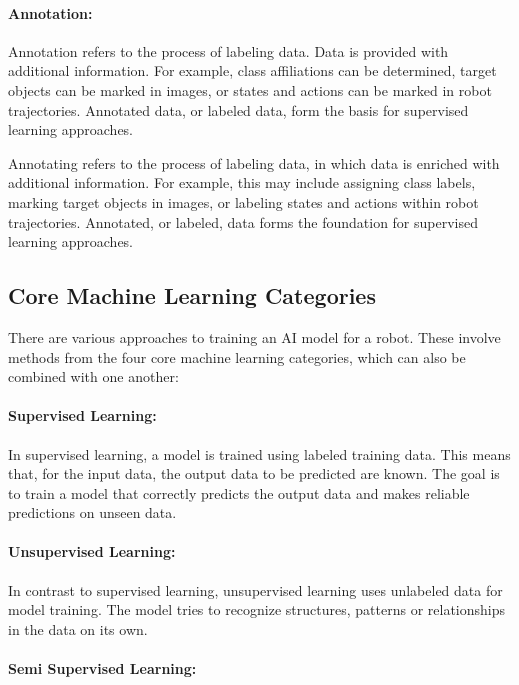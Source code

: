 \paragraph{Annotation:}

Annotation refers to the process of labeling data. Data is provided with additional information. For example, class affiliations can be determined, target objects can be marked in images, or states and actions can be marked in robot trajectories. Annotated data, or labeled data, form the basis for supervised learning approaches.

Annotating refers to the process of labeling data, in which data is enriched with additional information. For example, this may include assigning class labels, marking target objects in images, or labeling states and actions within robot trajectories. Annotated, or labeled, data forms the foundation for supervised learning approaches.


\subsection{Core Machine Learning Categories}
There are various approaches to training an AI model for a robot. These involve methods from the four core machine learning categories, which can also be combined with one another:

\paragraph{Supervised Learning: }

In supervised learning, a model is trained using labeled training data. This means that, for the input data, the output data to be predicted are known. The goal is to train a model that correctly predicts the output data and makes reliable predictions on unseen data. 


\paragraph{Unsupervised Learning: }

In contrast to supervised learning, unsupervised learning uses unlabeled data for model training. The model tries to recognize structures, patterns or relationships in the data on its own. 

\paragraph{Semi Supervised Learning: }

